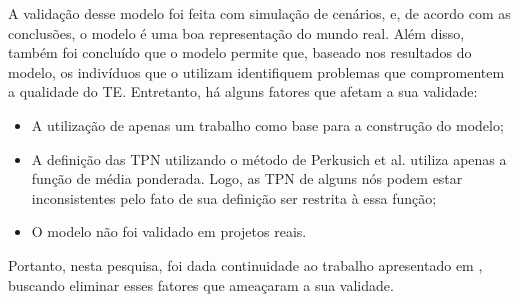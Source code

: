 A validação desse modelo foi feita com simulação de cenários, e, de acordo com as conclusões, o modelo é uma boa representação do mundo real. Além disso, também foi concluído que o modelo permite que, baseado nos resultados do modelo, os indivíduos que o utilizam identifiquem problemas que compromentem a qualidade do TE. Entretanto, há alguns fatores que afetam a sua validade:

\begin{itemize}
  \item A utilização de apenas um trabalho como base para a construção do modelo;
  \item A definição das TPN utilizando o método de Perkusich et al. utiliza apenas a função de média ponderada. Logo, as TPN de alguns nós podem estar inconsistentes pelo fato de sua definição ser restrita à essa função;
  \item O modelo não foi validado em projetos reais.
\end{itemize}

Portanto, nesta pesquisa, foi dada continuidade ao trabalho apresentado em \cite{freire}, buscando eliminar esses fatores que ameaçaram a sua validade.
